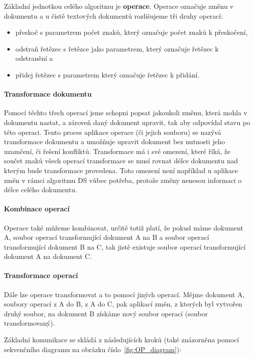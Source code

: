 Základní jednotkou celého algoritmu je \textbf{operace}.
Operace označuje změnu v dokumentu a u čistě textových dokumentů rozlišujeme tři druhy operací:
\begin{itemize}
    \item přeskoč s parametrem počet znaků, který označuje počet znaků k přeskočení,
    \item odstraň řetězec s řetězce jako parametrem, který označuje řetězec k odstranění a
    \item přidej řetězec s parametrem který označuje řetězec k přidání.~\cite{ot:aboutOT}
\end{itemize}

\paragraph{Transformace dokumentu}
Pomocí těchto třech operací jsme schopni popsat jakoukoli změnu, která mohla v dokumentu nastat, a zároveň daný dokument upravit, tak aby odpovídal stavu po této operaci.
Tento proces aplikace operace (či jejich souboru) se nazývá transformace dokumentu a umožňuje upravit dokument bez nutnosti jeho uzamčení, či řešení konfliktů.
Transformace má i své omezení, které říká, že součet znaků všech operací transformace se musí rovnat délce dokumentu nad kterým bude transformace provedena.
Toto omezení není například u aplikace změn v rámci algoritmu \gls{DS} vůbec potřeba, protože změny nenesou informaci o délce celého dokumentu.

\paragraph{Kombinace operací}
Operace také můžeme kombinovat, určitě totiž platí, že pokud máme dokument A, soubor operací transformující dokument A na B a soubor operací transformující dokument B na C, tak jistě existuje soubor operací transformující dokument A na dokument C.

\paragraph{Transformace operací}
Dále lze operace transformovat a to pomocí jiných operací.
Mějme dokument A, soubory operací z A do B, z A do C, pak aplikací změn, z kterých byl vytvořen druhý soubor, na dokument B získáme nový soubor operací (soubor transformovaný).~\cite{ot:codecommit}

Základní komunikace se skládá z následujících kroků (také znázorněna pomocí sekvenčního diagramu na obrázku číslo~\ref{fig:OP_diagram}):

